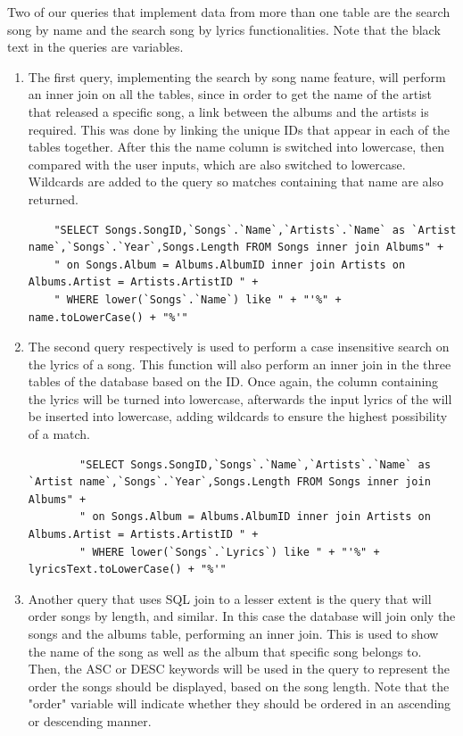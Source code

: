 \documentclass[a4paper,12pt]{article}
\begin{document}
Two of our queries that implement data from more than one table are the search song by name and the search song by lyrics functionalities. Note that the black text in the queries are variables.


\begin{enumerate} 
	\item 
	
	
	The first query, implementing the search by song name feature, will perform an inner join on all the tables, since in order to get the name of the artist that released a specific song, a link between the albums and the artists is required. This was done by linking the unique IDs that appear in each of the tables together. After this the name column is switched into lowercase, then compared with the user inputs, which are also switched to lowercase. Wildcards are added to the query so matches containing that name are also returned.
	
	\begin{lstlisting}
	"SELECT Songs.SongID,`Songs`.`Name`,`Artists`.`Name` as `Artist name`,`Songs`.`Year`,Songs.Length FROM Songs inner join Albums" +
	" on Songs.Album = Albums.AlbumID inner join Artists on Albums.Artist = Artists.ArtistID " +
	" WHERE lower(`Songs`.`Name`) like " + "'%" + name.toLowerCase() + "%'"
	\end{lstlisting}
	
	\item The second query respectively is used to perform a case insensitive search on the lyrics of a song. This function will also perform an inner join in the three tables of the database based on the ID. Once again, the column containing the lyrics will be turned into lowercase, afterwards the input lyrics of the will be inserted into lowercase, adding wildcards to ensure the highest possibility of a match.
	
	\begin{lstlisting}
		"SELECT Songs.SongID,`Songs`.`Name`,`Artists`.`Name` as `Artist name`,`Songs`.`Year`,Songs.Length FROM Songs inner join Albums" +
		" on Songs.Album = Albums.AlbumID inner join Artists on Albums.Artist = Artists.ArtistID " +
		" WHERE lower(`Songs`.`Lyrics`) like " + "'%" + lyricsText.toLowerCase() + "%'"
	\end{lstlisting}

	\item Another query that uses SQL join to a lesser extent is the query that will order songs by length, and similar. In this case the database will join only the songs and the albums table, performing an inner join. This is used to show the name of the song as well as the album that specific song belongs to. Then, the ASC or DESC keywords will be used in the query to represent the order the songs should be displayed, based on the song length. Note that the "order" variable will indicate whether they should be ordered in an ascending or descending manner.
	

\end{enumerate}
\end{document}
